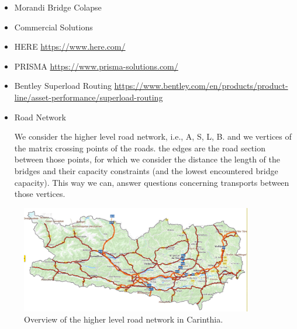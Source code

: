 \begin{itemize}
\item Morandi Bridge Colapse

\cite{Morgese.2020}
\cite{MorandiNYTimes}


\item Commercial Solutions

\item HERE
\url{https://www.here.com/}
\item PRISMA
\url{https://www.prisma-solutions.com/}

\item Bentley Superload Routing
\url{https://www.bentley.com/en/products/product-line/asset-performance/superload-routing}



\item Road Network

We consider the higher level road network, i.e., A, S, L, B.
and we vertices of the matrix crossing points of the roads.
the edges are the road section between those points, for which we
consider the distance the length of the bridges and their capacity constraints (and the lowest encountered bridge capacity).
This way we can, answer questions concerning transports between those vertices.
\end{itemize}

\begin{figure}
 \centering
  \includegraphics[width=0.9\textwidth]{map.jpg}
  \caption{Overview of the higher level road network in Carinthia.}
  \label{fig:higher level}
\end{figure}
